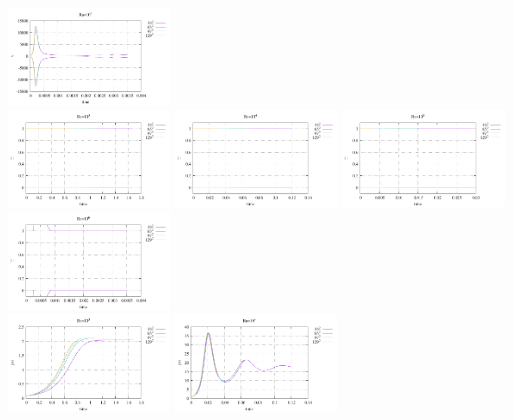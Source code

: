 \begin{center}
\includegraphics[width=4.297cm]{python_codes/fieldstone_155/results/stats_v_Ra1e6}\\
\includegraphics[width=4.297cm]{python_codes/fieldstone_155/results/stats_T_Ra1e3}
\includegraphics[width=4.297cm]{python_codes/fieldstone_155/results/stats_T_Ra1e4}
\includegraphics[width=4.297cm]{python_codes/fieldstone_155/results/stats_T_Ra1e5}
\includegraphics[width=4.297cm]{python_codes/fieldstone_155/results/stats_T_Ra1e6}\\
\includegraphics[width=4.297cm]{python_codes/fieldstone_155/results/stats_psi_Ra1e3}
\includegraphics[width=4.297cm]{python_codes/fieldstone_155/results/stats_psi_Ra1e4}

\end{center}
